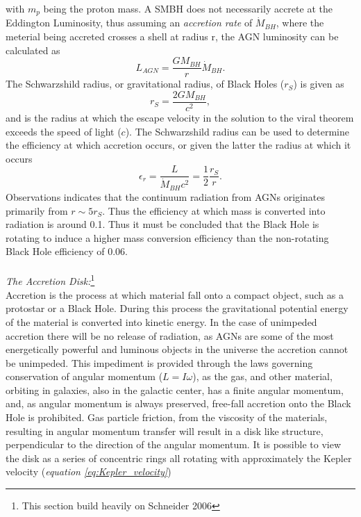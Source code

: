 \documentclass[a4paper, 12pt, twoside]{article}
\begin{document}
with $m_{p}$ being the proton mass. A SMBH does not necessarily accrete at the Eddington Luminosity, thus assuming an \emph{accretion rate} of $\dot{M}_{BH}$, where the meterial being accreted crosses a shell at radius r, the AGN luminosity can be calculated as
\begin{equation}
L_{AGN} = \frac{GM_{BH}} {r}\dot{M}_{BH}.
\label{eq:L_AGN}
\end{equation}
The Schwarzshild radius, or gravitational radius, of Black Holes ($r_S$) is given as
\begin{equation}
r_{S} = \frac{2GM_{BH}} {c^{2}},
\label{eq:r_S}
\end{equation}
and is the radius at which the escape velocity in the solution to the viral theorem exceeds the speed of light ($c$). The Schwarzshild radius can be used to determine the efficiency at which accretion occurs, or given the latter the radius at which it occurs
\begin{equation}
\epsilon_{r} = \frac{L} {\dot{M}_{BH}c^{2}} = \frac{1}{2}\frac{r_{S}}{r}.
\label{eq:epsilon_r}
\end{equation}
Observations indicates that the continuum radiation from AGNs originates primarily from $r\sim5r_{S}$. Thus the efficiency at which mass is converted into radiation is around 0.1. Thus it must be concluded that the Black Hole is rotating to induce a higher mass conversion efficiency than the non-rotating Black Hole efficiency of 0.06.  \\
\\
\emph{The Accretion Disk:}\footnote{This section build heavily on Schneider 2006} \\
Accretion is the process at which material fall onto a compact object, such as a protostar or a Black Hole. During this process the gravitational potential energy of the material is converted into kinetic energy. In the case of unimpeded accretion there will be no release of radiation, as AGNs are some of the most energetically powerful and luminous objects in the universe the accretion cannot be unimpeded. This impediment is provided through the laws governing conservation of angular momentum ($L=I\omega$), as the gas, and other material, orbiting in galaxies, also in the galactic center, has a finite angular momentum, and, as angular momentum is always preserved, free-fall accretion onto the Black Hole is prohibited. Gas particle friction, from the viscosity of the materials, resulting in angular momentum transfer will result in a disk like structure, perpendicular to the direction of the angular momentum. It is possible to view the disk as a series of concentric rings all rotating with approximately the Kepler velocity (\emph{equation \ref{eq:Kepler_velocity}})
\end{document}
